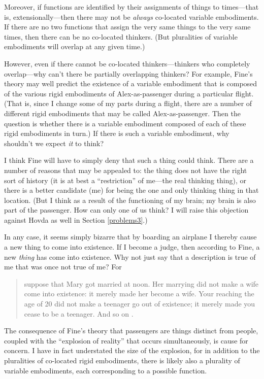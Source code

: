 \documentclass[12pt,twoside]{reedfancy}
\begin{document}
\begin{spacing}{1.25}
Moreover, if functions are identified by their assignments of things
to times---that is, extensionally---then there may not be {\em always}
co-located variable embodiments.  If there are no two functions that
assign the very same things to the very same times, then there can be
no co-located thinkers.  (But pluralities of variable embodiments will
overlap at any given time.)

However, even if there cannot be co-located thinkers---thinkers who
completely overlap---why can't there be partially overlapping
thinkers?  For example, Fine's theory may well predict the existence
of a variable embodiment that is composed of the various rigid
embodiments of Alex-as-passenger during a particular flight.  (That
is, since I change some of my parts during a flight, there are a
number of different rigid embodiments that may be called
Alex-as-passenger.  Then the question is whether there is a variable
embodiment composed of each of these rigid embodiments in turn.)  If
there is such a variable embodiment, why shouldn't we expect {\em it}
to think?

I think Fine will have to simply deny that such a thing could think.
There are a number of reasons that may be appealed to: the thing does
not have the right sort of history (it is at best a ``restriction'' of
me---the real thinking thing), or there is a better candidate (me) for
being the one and only thinking thing in that location.  (But I think
as a result of the functioning of my brain; my brain is also part of
the passenger.  How can only one of us think?  I will raise this
objection against Hovda as well in Section \ref{problems3}.)

In any case, it seems simply bizarre that by boarding an airplane I
thereby cause a new thing to come into existence.  If I become a
judge, then according to Fine, a new {\em thing} has come into
existence.  Why not just say that a description is true of me that was
once not true of me?  For

\begin{quote}
suppose that Mary got married at noon.  Her marrying did not make a
wife come into existence: it merely made her become a wife.  Your
reaching the age of 20 did not make a teenager go out of existence; it
merely made you cease to be a teenager.  And so on
\citep[151]{thomson1998a}.
\end{quote}

The consequence of Fine's theory that passengers are things distinct
from people, coupled with the ``explosion of reality'' that occurs
simultaneously, is cause for concern.  I have in fact understated the
size of the explosion, for in addition to the pluralities of
co-located rigid embodiments, there is likely also a plurality of
variable embodiments, each corresponding to a possible function.


\end{spacing}
\end{document}
